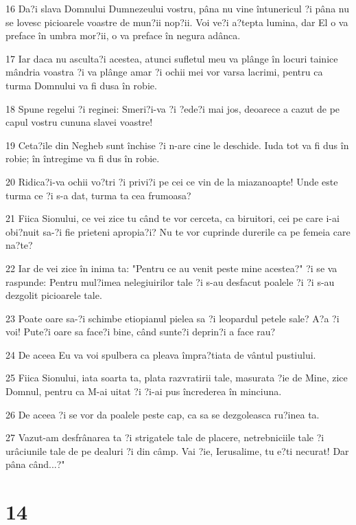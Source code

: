 \par 16 Da?i slava Domnului Dumnezeului vostru, pâna nu vine întunericul ?i pâna nu se lovesc picioarele voastre de mun?ii nop?ii. Voi ve?i a?tepta lumina, dar El o va preface în umbra mor?ii, o va preface în negura adânca.
\par 17 Iar daca nu asculta?i acestea, atunci sufletul meu va plânge în locuri tainice mândria voastra ?i va plânge amar ?i ochii mei vor varsa lacrimi, pentru ca turma Domnului va fi dusa în robie.
\par 18 Spune regelui ?i reginei: Smeri?i-va ?i ?ede?i mai jos, deoarece a cazut de pe capul vostru cununa slavei voastre!
\par 19 Ceta?ile din Negheb sunt închise ?i n-are cine le deschide. Iuda tot va fi dus în robie; în întregime va fi dus în robie.
\par 20 Ridica?i-va ochii vo?tri ?i privi?i pe cei ce vin de la miazanoapte! Unde este turma ce ?i s-a dat, turma ta cea frumoasa?
\par 21 Fiica Sionului, ce vei zice tu când te vor cerceta, ca biruitori, cei pe care i-ai obi?nuit sa-?i fie prieteni apropia?i? Nu te vor cuprinde durerile ca pe femeia care na?te?
\par 22 Iar de vei zice în inima ta: "Pentru ce au venit peste mine acestea?" ?i se va raspunde: Pentru mul?imea nelegiuirilor tale ?i s-au desfacut poalele ?i ?i s-au dezgolit picioarele tale.
\par 23 Poate oare sa-?i schimbe etiopianul pielea sa ?i leopardul petele sale? A?a ?i voi! Pute?i oare sa face?i bine, când sunte?i deprin?i a face rau?
\par 24 De aceea Eu va voi spulbera ca pleava împra?tiata de vântul pustiului.
\par 25 Fiica Sionului, iata soarta ta, plata razvratirii tale, masurata ?ie de Mine, zice Domnul, pentru ca M-ai uitat ?i ?i-ai pus încrederea în minciuna.
\par 26 De aceea ?i se vor da poalele peste cap, ca sa se dezgoleasca ru?inea ta.
\par 27 Vazut-am desfrânarea ta ?i strigatele tale de placere, netrebniciile tale ?i urâciunile tale de pe dealuri ?i din câmp. Vai ?ie, Ierusalime, tu e?ti necurat! Dar pâna când...?"

\chapter{14}

